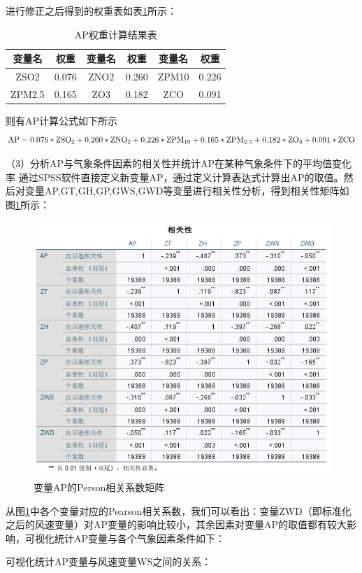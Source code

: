 \documentclass[bwprint]{gmcmthesis}
\numberwithin{figure}{section}
\begin{document}
进行修正之后得到的权重表如表\ref{tab:table4-5}所示：
\begin{table}[h!]
	\caption{AP权重计算结果表}\label{tab:table4-5}
	\begin{center}
		\begin{tabular}{|c|c|c|c|c|c|}
			\hline
			变量名&权重&变量名&权重&变量名&权重 \\
			\hline
			ZSO2&0.076&ZNO2&0.260&ZPM10&0.226 \\
			\hline
			ZPM2.5&0.165&ZO3&0.182&ZCO&0.091\\
			\hline
		\end{tabular}
	\end{center}
\end{table}

则有AP计算公式如下所示
\begin{equation*}
	\rm AP = 0.076*ZSO_2+0.260*ZNO_2+0.226*ZPM_{10}+0.165*ZPM_{2.5}+0.182*ZO_3+0.091*ZCO
\end{equation*}

（3）分析AP与气象条件因素的相关性并统计AP在某种气象条件下的平均值变化率
	通过SPSS软件直接定义新变量AP，通过定义计算表达式计算出AP的取值。然后对变量AP,GT,GH,GP,GWS,GWD等变量进行相关性分析，得到相关性矩阵如图\ref{fig3-4}所示：
	\begin{figure}[!h]
		\centering
		\includegraphics[width=.7\textwidth]{figures//fig3-4.png}
		\caption{变量AP的Person相关系数矩阵}
		\label{fig3-4}
	\end{figure}
	
	从图\ref{fig3-4}中各个变量对应的Pearson相关系数，我们可以看出：变量ZWD（即标准化之后的风速变量）对AP变量的影响比较小，其余因素对变量AP的取值都有较大影响，可视化统计AP变量与各个气象因素条件如下：
	
	 可视化统计AP变量与风速变量WS之间的关系：
	
\end{document}
